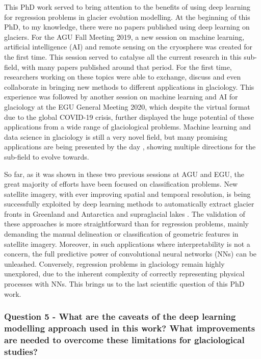 This PhD work served to bring attention to the benefits of using deep learning for regression problems in glacier evolution modelling. At the beginning of this PhD, to my knowledge, there were no papers published using deep learning on glaciers. For the AGU Fall Meeting 2019, a new session on machine learning, artificial intelligence (AI) and remote sensing on the cryosphere was created for the first time. This session served to catalyse all the current research in this sub-field, with many papers published around that period. For the first time, researchers working on these topics were able to exchange, discuss and even collaborate in bringing new methods to different applications in glaciology. This experience was followed by another session on machine learning and AI for glaciology at the EGU General Meeting 2020, which despite the virtual format due to the global COVID-19 crisis, further displayed the huge potential of these applications from a wide range of glaciological problems. Machine learning and data science in glaciology is still a very novel field, but many promising applications are being presented by the day \citep[e.g.][]{leong_deepbedmap_2020, brinkerhoff_constraining_2020}, showing multiple directions for the sub-field to evolve towards. 

So far, as it was shown in these two previous sessions at AGU and EGU, the great majority of efforts have been focused on classification problems. New satellite imagery, with ever improving spatial and temporal resolution, is being successfully exploited by deep learning methods to automatically extract glacier fronts in Greenland and Antarctica \citep[e.g.][]{lea_google_2018,baumhoer_automated_2019,mohajerani_detection_2019, zhang_automatically_2019} and supraglacial lakes \cite[e.g.][]{yuan_automatic_2020}. The validation of these approaches is more straightforward than for regression problems, mainly demanding the manual delineation or classification of geometric features in satellite imagery. Moreover, in such applications where interpretability is not a concern, the full predictive power of convolutional neural networks (NNs) can be unleashed. Conversely, regression problems in glaciology remain highly unexplored, due to the inherent complexity of correctly representing physical processes with NNs. This brings us to the last scientific question of this PhD work.

\subsubsection{Question 5 - What are the caveats of the deep learning modelling approach used in this work? What improvements are needed to overcome these limitations for glaciological studies?}


